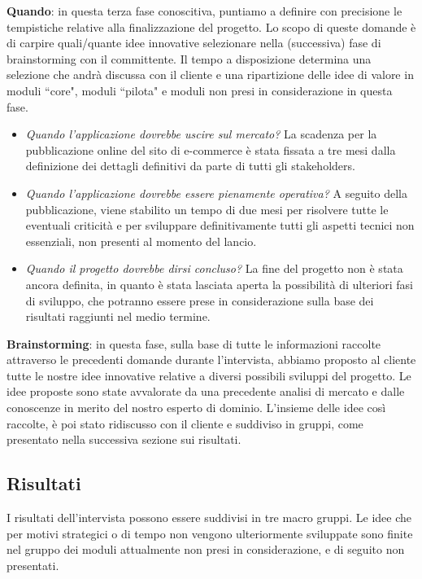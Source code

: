 \documentclass[12pt]{article}
\begin{document}
\textbf{Quando}: in questa terza fase conoscitiva, puntiamo a definire con precisione le tempistiche relative alla finalizzazione del progetto. Lo scopo di queste domande è di carpire quali/quante idee innovative selezionare nella (successiva) fase di brainstorming con il committente. Il tempo a disposizione determina una selezione che andrà discussa con il cliente e una ripartizione delle idee di valore in moduli ``core", moduli ``pilota" e moduli non presi in considerazione in questa fase.
\begin{itemize}
    \item {\em Quando l'applicazione dovrebbe uscire sul mercato?}
    La scadenza per la pubblicazione online del sito di e-commerce è stata fissata a tre mesi dalla definizione dei dettagli definitivi da parte di tutti gli stakeholders. 
    \item {\em Quando l'applicazione dovrebbe essere pienamente operativa?}
    A seguito della pubblicazione, viene stabilito un tempo di due mesi per risolvere tutte le eventuali criticità e per sviluppare definitivamente tutti gli aspetti tecnici non essenziali, non presenti al momento del lancio.
    \item {\em Quando il progetto dovrebbe dirsi concluso?}
    La fine del progetto non è stata ancora definita, in quanto è stata lasciata aperta la possibilità di ulteriori fasi di sviluppo, che potranno essere prese in considerazione sulla base dei risultati raggiunti nel medio termine.
    
\end{itemize}



\textbf{Brainstorming}: in questa fase, sulla base di tutte le informazioni raccolte attraverso le precedenti domande durante l'intervista, abbiamo proposto al cliente tutte le nostre idee innovative relative a diversi possibili sviluppi del progetto. Le idee proposte sono state avvalorate da una precedente analisi di mercato e dalle conoscenze in merito del nostro esperto di dominio. L'insieme delle idee così raccolte, è poi stato ridiscusso con il cliente e suddiviso in gruppi, come presentato nella successiva sezione sui risultati.
\\

\subsection{Risultati}

I risultati dell'intervista possono essere suddivisi in tre macro gruppi.
Le idee che per motivi strategici o di tempo non vengono ulteriormente sviluppate sono finite nel gruppo dei moduli attualmente non presi in considerazione, e di seguito non presentati.
\end{document}
